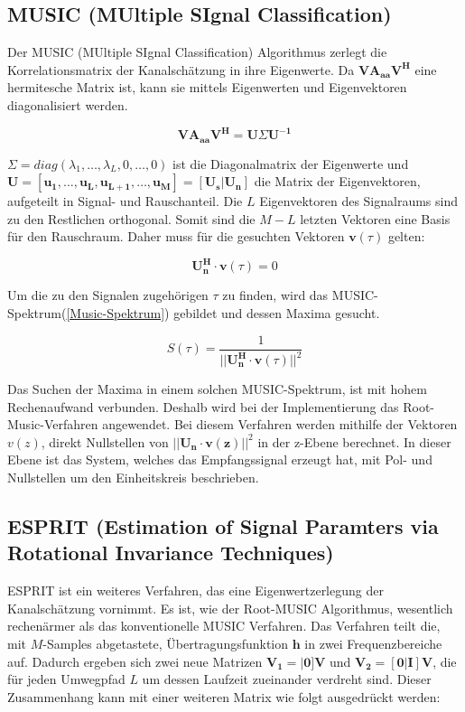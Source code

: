 \subsection{MUSIC (MUltiple SIgnal Classification)}
\label{chap3.3.2:MUSIC}
Der MUSIC (MUltiple SIgnal Classification) Algorithmus zerlegt die Korrelationsmatrix der Kanalschätzung in ihre Eigenwerte. Da $\mathbf{VA_{aa}V^H}$ eine hermitesche Matrix ist, kann sie mittels Eigenwerten und Eigenvektoren diagonalisiert werden. 

\begin{equation}
	\label{eq:Eigenwertzerlegung}
	\mathbf{VA_{aa}V^H} = \mathbf{U} \Sigma \mathbf{U^{-1}}
\end{equation} 

$\Sigma = diag(\lambda_1, \ldots, \lambda_L, 0, \ldots, 0)$ ist die Diagonalmatrix der Eigenwerte und \\
$\mathbf{U}=[\mathbf{u_1, \ldots, u_L,u_{L+1},\ldots, u_M}] = [\mathbf{U_s}|\mathbf{U_n}]$ die Matrix der Eigenvektoren, aufgeteilt in Signal- und Rauschanteil. Die $L$ Eigenvektoren des Signalraums sind zu den Restlichen orthogonal. Somit sind die $M - L$ letzten Vektoren eine Basis für den Rauschraum. Daher muss für die gesuchten Vektoren $\mathbf{v}(\tau)$ gelten:

\begin{equation}
	\label{music bedingung}
	\mathbf{U_n^H}\cdot \mathbf{v}(\tau) = 0
\end{equation}

Um die zu den Signalen zugehörigen $\tau$ zu finden, wird das MUSIC-Spektrum(\ref{Music-Spektrum}) gebildet und dessen Maxima gesucht. 

\begin{equation}
	\label{Music-Spektrum}
	S(\tau) = \frac{1}{||\mathbf{U_n^H}\cdot \mathbf{v}(\tau)||^2}
\end{equation}

Das Suchen der Maxima in einem solchen MUSIC-Spektrum, ist mit hohem Rechenaufwand verbunden. Deshalb wird bei der Implementierung das Root-Music-Verfahren angewendet. Bei diesem  Verfahren werden mithilfe der Vektoren $v(z)$, direkt Nullstellen von $||\mathbf{U_n} \cdot \mathbf{v(z)}||^2$ in der z-Ebene berechnet.
In dieser Ebene ist das System, welches das Empfangssignal erzeugt hat, mit Pol- und Nullstellen um den Einheitskreis beschrieben. 

\subsection{ESPRIT (Estimation of Signal Paramters via Rotational Invariance Techniques)}
\label{chap3.3.3:ESPRIT}
ESPRIT ist ein weiteres Verfahren, das eine Eigenwertzerlegung der Kanalschätzung vornimmt. Es ist, wie der Root-MUSIC Algorithmus, wesentlich rechenärmer als das konventionelle MUSIC Verfahren. Das Verfahren teilt die, mit $M$-Samples abgetastete, Übertragungsfunktion $\mathbf{h}$ in zwei Frequenzbereiche auf. Dadurch ergeben sich zwei neue Matrizen $\mathbf{V_1} = \mathbf{|0]V}$ und $\mathbf{V_2} = \mathbf{[0|I]V}$, die für jeden Umwegpfad $L$ um dessen Laufzeit zueinander verdreht sind. Dieser Zusammenhang kann mit einer weiteren Matrix wie folgt ausgedrückt werden: 

